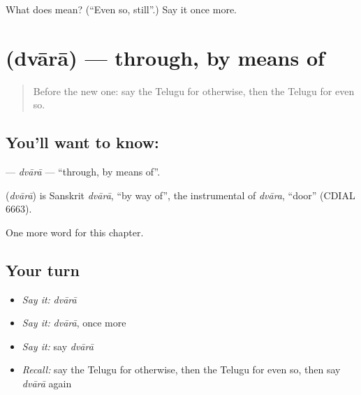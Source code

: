 \begin{tcolorbox}[breakable,colback=teal!4,colframe=teal!35!black,title={Before you move on}]
What does  mean? (\textquotedblleft{}Even so, still\textquotedblright{}.) Say it once more.
\end{tcolorbox}
\section[\texorpdfstring{\te{ద్వారా} (dvārā)}{ద్వారా (dvārā)}]{ (dvārā) — through, by means of}

\label{lesson:TE-C176-dvara}



\begin{quote}
Before the new one: say the Telugu for otherwise, then the Telugu for even so.
\end{quote}

\subsection*{You'll want to know: }
\textbf{} — \emph{dvārā} — \textquotedblleft{}through, by means of\textquotedblright{}.

\begin{cousinweb}
\textbf{} (\emph{dvārā}) is Sanskrit \emph{dvārā}, \textquotedblleft{}by way of\textquotedblright{}, the instrumental of \emph{dvāra}, \textquotedblleft{}door\textquotedblright{} (CDIAL 6663).
\end{cousinweb}

\begin{grammarlens}[title={What you've built}]
One more word for this chapter.
\end{grammarlens}

\subsection*{Your turn}
\begin{itemize}
\raggedright
  \item \emph{Say it:} \emph{dvārā}
  \item \emph{Say it:} \emph{dvārā}, once more
  \item \emph{Say it:} say \emph{dvārā}
  \item \emph{Recall:} say the Telugu for otherwise, then the Telugu for even so, then say \emph{dvārā} again
\end{itemize}

